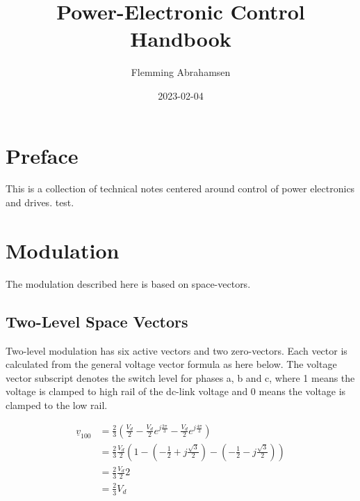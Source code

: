 \documentclass[]{book}
\title{Power-Electronic Control Handbook}
\author{Flemming Abrahamsen}
\date{2023-02-04}
\begin{document}
\maketitle

{
\setcounter{tocdepth}{1}
\tableofcontents
}
\hypertarget{preface}{%
\chapter{Preface}\label{preface}}

This is a collection of technical notes centered around control of power electronics and drives.
test.

\hypertarget{modulation}{%
\chapter{Modulation}\label{modulation}}

The modulation described here is based on space-vectors.

\hypertarget{two-level-space-vectors}{%
\section{Two-Level Space Vectors}\label{two-level-space-vectors}}

Two-level modulation has six active vectors and two zero-vectors. Each vector is calculated from the general voltage vector formula as here below. The voltage vector subscript denotes the switch level for phases a, b and c, where 1 means the voltage is clamped to high rail of the dc-link voltage and 0 means the voltage is clamped to the low rail.

\[
\begin{aligned}
\underline{v}_{100} 
& = \frac{2}{3} \left( \frac{V_d}{2} - \frac{V_d}{2} e^{j \frac{2 \pi}{3}}- \frac{V_d}{2} e^{j \frac{4 \pi}{3}} \right)\\
& = \frac{2}{3} \frac{V_d}{2} \left( 1-  (- \frac{1}{2}+j\frac{\sqrt{3}}{2}) - (- \frac{1}{2}-j\frac{\sqrt{3}}{2}) \right)\\
& = \frac{2}{3} \frac{V_d}{2} 2\\
& = \frac{2}{3} V_d\\
\end{aligned}
\]
\end{document}

